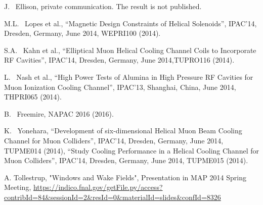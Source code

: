 \documentclass[11pt]{article}
\begin{document}
\begin{thebibliography}{99}
    J. ~Ellison, private communication. The result is not published. 
    
    M.L. ~Lopes et al., ``Magnetic Design Constraints of Helical Solenoids'',
    IPAC'14, Dresden, Germany,
    June 2014, WEPRI100 (2014).

    S.A. ~Kahn et al., ``Elliptical Muon Helical Cooling Channel Coils to Incorporate RF Cavities'',
    IPAC'14, Dresden, Germany,
    June 2014,TUPRO116 (2014).

    L. ~Nash et al., ``High Power Tests of Alumina in High Pressure RF Cavities for Muon Ionization Cooling Channel'',
    IPAC'13, Shanghai, China,
    June 2014, THPRI065 (2014).

	B. ~Freemire, NAPAC 2016 (2016).

    K. ~Yonehara, ``Development of six-dimensional Helical Muon Beam Cooling Channel for Muon Colliders'',
    IPAC'14, Dresden, Germany,
    June 2014, TUPME014 (2014), ``Study Cooling Performance in a Helical Cooling Channel for Muon Colliders'',
     IPAC'14, Dresden, Germany,
    June 2014, TUPME015 (2014).

	A. Tollestrup, "Windows and Wake Fields", 
	Presentation in MAP 2014 Spring Meeting, 
	 \url{https://indico.fnal.gov/getFile.py/access?contribId=84&sessionId=2&resId=0&materialId=slides&confId=8326}





\end{thebibliography}
\end{document}
